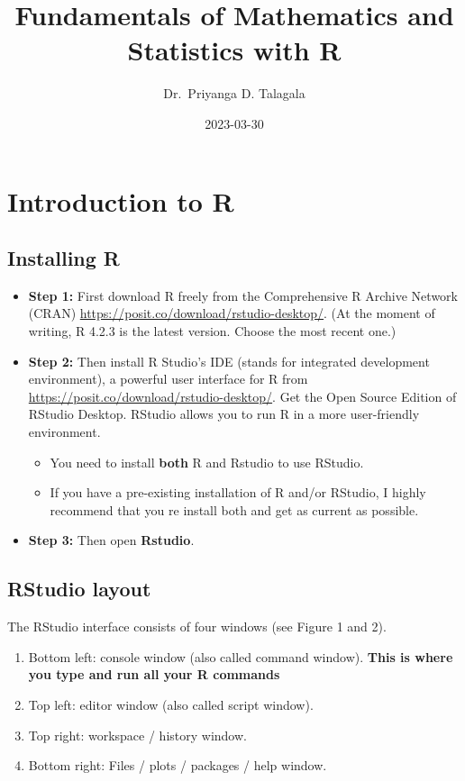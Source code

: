 \documentclass[
]{book}
\title{Fundamentals of Mathematics and Statistics with R}
\author{Dr.~Priyanga D. Talagala}
\date{2023-03-30}
\begin{document}
\maketitle

{
\setcounter{tocdepth}{1}
\tableofcontents
}
\hypertarget{intro}{%
\chapter{Introduction to R}\label{intro}}


\hypertarget{installing-r}{%
\section{Installing R}\label{installing-r}}

\begin{itemize}
\item
  \textbf{Step 1:} First download R freely from the Comprehensive R Archive Network (CRAN) \url{https://posit.co/download/rstudio-desktop/}.
  (At the moment of writing, R 4.2.3 is the latest version. Choose the most recent one.)
\item
  \textbf{Step 2:} Then install R Studio's IDE (stands for integrated development environment), a powerful user interface for R from \url{https://posit.co/download/rstudio-desktop/}. Get the Open Source Edition of RStudio Desktop. RStudio allows you to run R in a more user-friendly environment.

  \begin{itemize}
  \item
    You need to install \textbf{both} R and Rstudio to use RStudio.
  \item
    If you have a pre-existing installation of R and/or RStudio, I highly recommend that you re install both and get as current as possible.
  \end{itemize}
\item
  \textbf{Step 3:} Then open \textbf{Rstudio}.
\end{itemize}

\hypertarget{rstudio-layout}{%
\section{RStudio layout}\label{rstudio-layout}}

The RStudio interface consists of four windows (see Figure 1 and 2).

\begin{enumerate}
\def\labelenumi{\arabic{enumi}.}
\item
  Bottom left: console window (also called command window). \textbf{This is where you type and run all your R commands}
\item
  Top left: editor window (also called script window).
\item
  Top right: workspace / history window.
\item
  Bottom right: Files / plots / packages / help window.
\end{enumerate}
\end{document}
